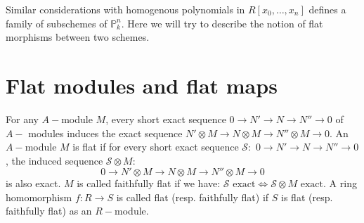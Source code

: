 \documentclass[12pt]{article}
\theoremstyle{mytheoremstyle}
\newcommand{\bP}{\mathbb{P}}
\begin{document}
\vspace*{2mm}
\hspace*{8mm}Similar considerations with homogenous polynomials
in $R[x_0,\ldots,x_n]$
defines a family of subschemes of $\bP^n_k$.
Here we will try to describe the notion of flat morphisms
between two schemes.

\section{Flat modules and flat maps}

\hspace*{8mm}For any $A-$module $M$, every short exact sequence
$0\longrightarrow N'\longrightarrow N\longrightarrow N''
\longrightarrow 0$ of $A-$ modules induces the exact sequence
$ N'\otimes M\longrightarrow N\otimes M
\longrightarrow N''\otimes M\longrightarrow 0$.
An $A-$module $M$ is flat if for every short exact sequence
$\mathcal{S}:$
$0\longrightarrow N'\longrightarrow N\longrightarrow N''
\longrightarrow 0$, the induced sequence $\mathcal{S}\otimes M:$ 
$$0\longrightarrow N'\otimes M\longrightarrow N\otimes M
\longrightarrow N''\otimes M\longrightarrow 0$$
is also exact. $M$ is called faithfully flat if we have:
$\mathcal{S}\text{ exact}\iff \mathcal{S}\otimes M \text{ exact}.$
A ring homomorphism $f:R \to S$ is called flat (resp. faithfully flat)
if $S$ is flat (resp. faithfully flat) as
an $R-$module.
\end{document}
